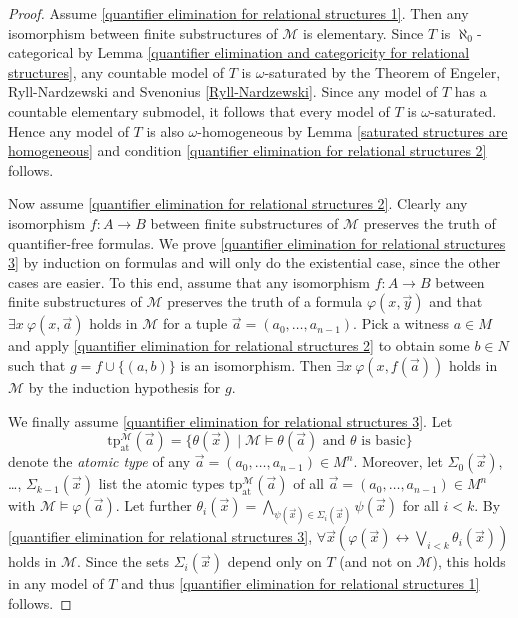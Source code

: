 \documentclass[10pt]{amsart}
\newcommand{\MM}{\mathcal{M}}
\newcommand{\tp}{\mathrm{tp}}
\theoremstyle{definition}
\theoremstyle{remark}
\begin{document}
\begin{proof} 
Assume \ref{quantifier elimination for relational structures 1}. 
Then any isomorphism between finite substructures of $\MM$ is elementary. Since $T$ is $\aleph_0$-categorical by Lemma \ref{quantifier elimination and categoricity for relational structures}, any countable model of $T$ is $\omega$-saturated by the Theorem of Engeler, Ryll-Nardzewski and Svenonius \ref{Ryll-Nardzewski}. Since any model of $T$ has a countable elementary submodel, it follows that every model of $T$ is $\omega$-saturated. Hence any model of $T$ is also $\omega$-homogeneous by Lemma \ref{saturated structures are homogeneous} and condition \ref{quantifier elimination for relational structures 2} follows. 

Now assume \ref{quantifier elimination for relational structures 2}. Clearly any isomorphism $f\colon A\rightarrow B$ between finite substructures of $\MM$ preserves the truth of quantifier-free formulas. We prove \ref{quantifier elimination for relational structures 3} by induction on formulas and will only do the existential case, since the other cases are easier. To this end, assume that any isomorphism $f\colon A\rightarrow B$ between finite substructures of $\MM$ preserves the truth of a formula $\varphi(x,\vec{y})$ and that $\exists x\ \varphi(x,\vec{a})$ holds in $\MM$ for a tuple $\vec{a}=(a_0,\dots,a_{n-1})$. Pick a witness $a\in M$ and apply \ref{quantifier elimination for relational structures 2} to obtain some $b\in N$ such that $g=f\cup\{(a,b)\}$ is an isomorphism. Then $\exists x\ \varphi(x,f(\vec{a}))$ holds in $\MM$ by the induction hypothesis for $g$. 

We finally assume \ref{quantifier elimination for relational structures 3}. Let 
$$\tp_{\mathrm{at}}^\MM(\vec{a})=\{ \theta(\vec{x})\mid \MM\models \theta(\vec{a})\text{ and $\theta$ is basic} \}$$ 
denote the \emph{atomic type} of any $\vec{a}=(a_0,\dots,a_{n-1})\in M^n$. Moreover, let $\Sigma_0(\vec{x})$, \dots, $\Sigma_{k-1}(\vec{x})$ list the atomic types $\tp_{\mathrm{at}}^\MM(\vec{a})$ of all $\vec{a}=(a_0,\dots,a_{n-1})\in M^n$ with $\MM\models \varphi(\vec{a})$. Let further $\theta_i(\vec{x})=\bigwedge_{\psi(\vec{x})\in \Sigma_i(\vec{x})}\psi(\vec{x})$ for all $i<k$. By \ref{quantifier elimination for relational structures 3}, $\forall \vec{x}(\varphi(\vec{x})\leftrightarrow \bigvee_{i<k}\theta_i(\vec{x}))$ holds in $\MM$. Since the sets $\Sigma_i(\vec{x})$ depend only on $T$ (and not on $\MM$), this holds in any model of $T$ and thus \ref{quantifier elimination for relational structures 1} follows. 
\end{proof} 
\end{document}
